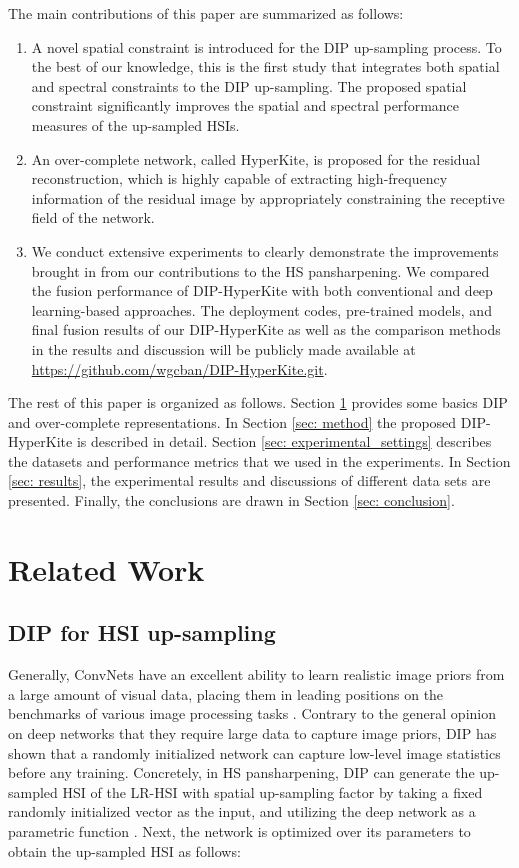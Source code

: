 \documentclass[journal]{IEEEtran}
\begin{document}
The main contributions of this paper are summarized as follows:
\begin{enumerate}
    \item A novel spatial constraint is introduced for the DIP up-sampling process. To the best of our knowledge, this is the first study that integrates both spatial and spectral constraints to the DIP up-sampling. The proposed spatial constraint significantly improves the spatial and spectral performance measures of the up-sampled HSIs.  
    \item An over-complete network, called HyperKite, is proposed for the residual reconstruction, which is highly capable of extracting high-frequency information of the residual image by appropriately constraining the receptive field of the network.
    \item We conduct extensive experiments to clearly demonstrate the improvements brought in from our contributions to the HS pansharpening. We compared the fusion performance of DIP-HyperKite with both conventional and deep learning-based approaches. The deployment codes, pre-trained models, and final fusion results of our DIP-HyperKite as well as the comparison methods in the results and discussion will be publicly made available at \url{https://github.com/wgcban/DIP-HyperKite.git}.
\end{enumerate}
The rest of this paper is organized as follows. Section \ref{sec: related_work} provides some basics DIP and over-complete representations. In Section \ref{sec: method} the proposed DIP-HyperKite is described in detail. Section \ref{sec: experimental_settings} describes the datasets and performance metrics that we used in the experiments. In Section \ref{sec: results}, the experimental results and discussions of different data sets are presented. Finally, the conclusions are drawn in Section \ref{sec: conclusion}.

\section{Related Work}
\label{sec: related_work}
\subsection{DIP for HSI up-sampling}
    \label{rw: dip}


    \par Generally, ConvNets have an excellent ability to learn realistic image priors from a large amount of visual data, placing them in leading positions on the benchmarks of various image processing tasks \cite{image_denoising, super_resolution}. Contrary to the general opinion on deep networks that they require large data to capture image priors, DIP \cite{DeepImagePrior} has shown that a randomly initialized network can capture low-level image statistics before any training. Concretely, in HS pansharpening, DIP can generate the up-sampled HSI  of the LR-HSI  with spatial up-sampling factor  by taking a fixed randomly initialized vector  as the input, and utilizing the deep network as a parametric function . Next, the network is optimized over its parameters  to obtain the up-sampled HSI  as follows:
    
\end{document}
